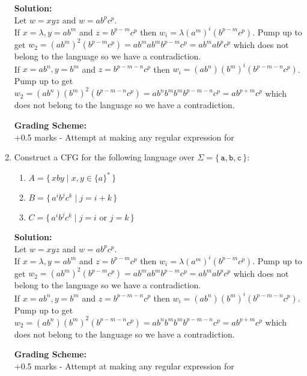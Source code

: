 \documentclass[11pt, article, oneside]{memoir}
\newcommand{\set}[1]{\{\, #1\, \}}
\begin{document}
\begin{enumerate}
        \textbf{Solution:}
        \\Let \(w = xyz\) and \(w = ab^pc^p\).
        \\If \(x = \lambda, y = ab^m\) and \(z = b^{p - m}c^p\) then \(w_i = \lambda(a^m)^i(b^{p - m}c^p)\). Pump up to get \(w_2 = (ab^m)^2(b^{p - m}c^p) = ab^mab^mb^{p - m}c^p = ab^mab^pc^p\) which does not belong to the language so we have a contradiction.
        \\If \(x = ab^n, y = b^m\) and \(z = b^{p - m - n}c^p\) then \(w_i = (ab^n)(b^m)^i(b^{p - m - n}c^p)\). Pump up to get \(w_2 = (ab^n)(b^m)^2(b^{p - m - n}c^p) = ab^nb^mb^mb^{p - m - n}c^p = ab^{p + m}c^p\) which does not belong to the language so we have a contradiction.

        \textbf{Grading Scheme:}
        \\+0.5 marks - Attempt at making any regular expression for
        
    \item
        Construct a CFG for the following language over \(\Sigma = \set{\texttt{a}, \texttt{b}, \texttt{c}}\):
        \begin{enumerate}
            \item
                \(A = \set{xby \mid x, y \in \{a\}^*}\) 
            \item
                \(B = \set{ {a^i}{b^j}{c^k} \mid j = i + k}\)
            \item
                \(C = \set{ {a^i}{b^j}{c^k} \mid j = i \text{ or } j = k}\)
        \end{enumerate}
                
        \textbf{Solution:}
        \\Let \(w = xyz\) and \(w = ab^pc^p\).
        \\If \(x = \lambda, y = ab^m\) and \(z = b^{p - m}c^p\) then \(w_i = \lambda(a^m)^i(b^{p - m}c^p)\). Pump up to get \(w_2 = (ab^m)^2(b^{p - m}c^p) = ab^mab^mb^{p - m}c^p = ab^mab^pc^p\) which does not belong to the language so we have a contradiction.
        \\If \(x = ab^n, y = b^m\) and \(z = b^{p - m - n}c^p\) then \(w_i = (ab^n)(b^m)^i(b^{p - m - n}c^p)\). Pump up to get \(w_2 = (ab^n)(b^m)^2(b^{p - m - n}c^p) = ab^nb^mb^mb^{p - m - n}c^p = ab^{p + m}c^p\) which does not belong to the language so we have a contradiction.

        \textbf{Grading Scheme:}
        \\+0.5 marks - Attempt at making any regular expression for
        

\end{enumerate}
\end{document}
